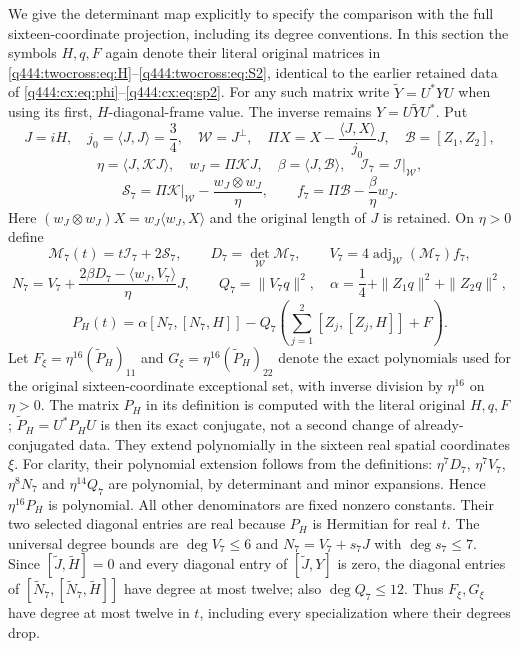 We give the determinant map explicitly to specify the comparison with the
full sixteen-coordinate projection, including its degree conventions.
In this section the symbols $H,q,F$ again denote their literal original
matrices in \eqref{q444:twocross:eq:H}--\eqref{q444:twocross:eq:S2},
identical to the earlier retained data of
\eqref{q444:cx:eq:phi}--\eqref{q444:cx:eq:sp2}. For any such matrix write
$\widetilde Y=U^*YU$ when using its first, $H$-diagonal-frame value.
The inverse remains $Y=U\widetilde YU^*$. Put
\[
J=iH,\quad j_0=\langle J,J\rangle=\frac34,\quad
\mathscr W=J^\perp,\quad
\Pi X=X-\frac{\langle J,X\rangle}{j_0}J,\quad \mathscr B=[Z_1,Z_2],
\]
\[
\eta=\langle J,\mathcal KJ\rangle,\quad w_J=\Pi\mathcal KJ,
\quad\beta=\langle J,\mathscr B\rangle,\quad
\mathcal I_7=\mathcal I|_{\mathscr W},
\]
\[
\mathcal S_7=\Pi\mathcal K|_{\mathscr W}
-\frac{w_J\otimes w_J}{\eta},\qquad
f_7=\Pi\mathscr B-\frac\beta\eta w_J.
\]
Here $(w_J\otimes w_J)X=w_J\langle w_J,X\rangle$ and the original length of
$J$ is retained. On $\eta>0$ define
\[
\mathscr M_7(t)=t\mathcal I_7+2\mathcal S_7,\qquad
D_7=\det_{\mathscr W}\mathscr M_7,\qquad
V_7=4\operatorname{adj}_{\mathscr W}(\mathscr M_7)f_7,
\]
\[
N_7=V_7+\frac{2\beta D_7-\langle w_J,V_7\rangle}{\eta}J,
\qquad Q_7=\|V_7q\|^2,
\quad\alpha=\frac14+\|Z_1q\|^2+\|Z_2q\|^2,
\]
\[
P_H(t)=\alpha[N_7,[N_7,H]]
-Q_7\left(\sum_{j=1}^2[Z_j,[Z_j,H]]+F\right).
\]
Let $F_\xi=\eta^{16}(\widetilde P_H)_{11}$ and
$G_\xi=\eta^{16}(\widetilde P_H)_{22}$ denote the exact polynomials used for
the original sixteen-coordinate exceptional set, with inverse division
by $\eta^{16}$ on $\eta>0$. The matrix $P_H$ in its definition is
computed with the literal original $H,q,F$; $\widetilde P_H=U^*P_HU$
is then its exact conjugate, not a second change of already-conjugated data.
They extend polynomially in the sixteen real spatial coordinates $\xi$.
For clarity, their polynomial extension follows from the definitions:
$\eta^7D_7$, $\eta^7V_7$, $\eta^8N_7$ and $\eta^{14}Q_7$ are polynomial,
by determinant and minor expansions. Hence $\eta^{16}P_H$ is polynomial.
All other denominators are fixed nonzero constants. Their two selected
diagonal entries are real because $P_H$ is Hermitian for real $t$.
The universal degree bounds are $\deg V_7\le6$ and
$N_7=V_7+s_7J$ with $\deg s_7\le7$. Since
$[\widetilde J,\widetilde H]=0$ and every diagonal entry of
$[\widetilde J,Y]$ is zero, the diagonal entries of
$[\widetilde N_7,[\widetilde N_7,\widetilde H]]$ have degree at most
twelve; also $\deg Q_7\le12$. Thus $F_\xi,G_\xi$ have degree at most
twelve in $t$, including every specialization where their degrees drop.

